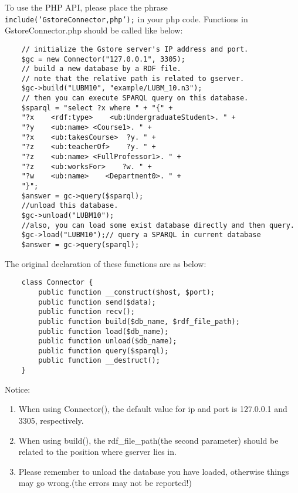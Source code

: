\documentclass[titlepage, a4paper, 12pt]{article}
\begin{document}
	
	
	To use the PHP API, please place the phrase
\texttt{include('GstoreConnector,php');} in your php code. Functions in
GstoreConnector.php should be called like below:
	
	\begin{verbatim}
	// initialize the Gstore server's IP address and port.
	$gc = new Connector("127.0.0.1", 3305);
	// build a new database by a RDF file.
	// note that the relative path is related to gserver.
	$gc->build("LUBM10", "example/LUBM_10.n3");
	// then you can execute SPARQL query on this database.
	$sparql = "select ?x where " + "{" +
	"?x    <rdf:type>    <ub:UndergraduateStudent>. " +
	"?y    <ub:name> <Course1>. " +
	"?x    <ub:takesCourse>  ?y. " +
	"?z    <ub:teacherOf>    ?y. " +
	"?z    <ub:name> <FullProfessor1>. " +
	"?z    <ub:worksFor>    ?w. " +
	"?w    <ub:name>    <Department0>. " +
	"}";
	$answer = gc->query($sparql);
	//unload this database.
	$gc->unload("LUBM10");
	//also, you can load some exist database directly and then query.
	$gc->load("LUBM10");// query a SPARQL in current database
	$answer = gc->query(sparql);
	\end{verbatim}
	
	The original declaration of these functions are as below:
	
	\begin{verbatim}
	class Connector {
		public function __construct($host, $port);
		public function send($data);
		public function recv();
		public function build($db_name, $rdf_file_path);
		public function load($db_name);
		public function unload($db_name);
		public function query($sparql);
		public function __destruct();
	}
	\end{verbatim}
	
	Notice:
	
	\begin{enumerate}
		\item
		When using Connector(), the default value for ip and port is
		127.0.0.1 and 3305, respectively.
		\item
		When using build(), the rdf\_file\_path(the second parameter) should
		be related to the position where gserver lies in.
		\item
		Please remember to unload the database you have loaded, otherwise
		things may go wrong.(the errors may not be reported!)
	\end{enumerate}
	
\end{document}
